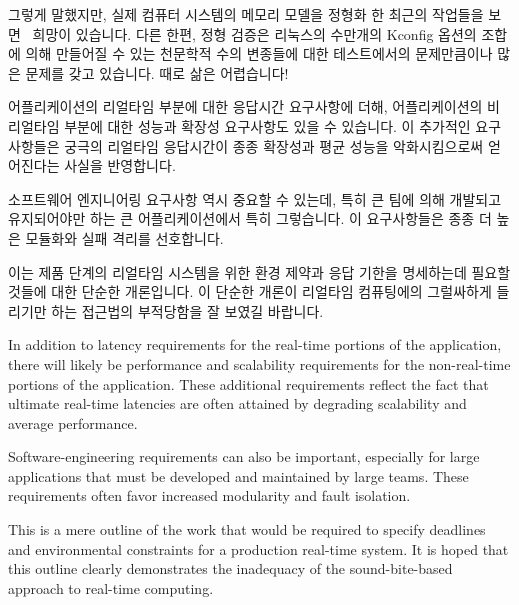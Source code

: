 {	\fi

	그렇게 말했지만, 실제 컴퓨터 시스템의 메모리 모델을 정형화 한 최근의
	작업들을
	보면~\cite{JadeAlglave2011ppcmem,Alglave:2013:SVW:2450268.2450306}
	희망이 있습니다.
	다른 한편, 정형 검증은 리눅스의 수만개의 Kconfig 옵션의 조합에 의해
	만들어질 수 있는 천문학적 수의 변종들에 대한 테스트에서의 문제만큼이나
	많은 문제를 갖고 있습니다.
	때로 삶은 어렵습니다!

}\QuickQuizEnd

어플리케이션의 리얼타임 부분에 대한 응답시간 요구사항에 더해, 어플리케이션의 비
리얼타임 부분에 대한 성능과 확장성 요구사항도 있을 수 있습니다.
이 추가적인 요구사항들은 궁극의 리얼타임 응답시간이 종종 확장성과 평균 성능을
악화시킴으로써 얻어진다는 사실을 반영합니다.

소프트웨어 엔지니어링 요구사항 역시 중요할 수 있는데, 특히 큰 팀에 의해
개발되고 유지되어야만 하는 큰 어플리케이션에서 특히 그렇습니다.
이 요구사항들은 종종 더 높은 모듈화와 실패 격리를 선호합니다.

이는 제품 단계의 리얼타임 시스템을 위한 환경 제약과 응답 기한을 명세하는데
필요할 것들에 대한 단순한 개론입니다.
이 단순한 개론이 리얼타임 컴퓨팅에의 그럴싸하게 들리기만 하는 접근법의
부적당함을 잘 보였길 바랍니다.

\iffalse

In addition to latency requirements for the real-time portions of the
application, there will likely be performance and scalability requirements
for the non-real-time portions of the application.
These additional requirements reflect the fact that ultimate real-time
latencies are often attained by degrading scalability and average performance.

Software-engineering requirements can also be important, especially for
large applications that must be developed and maintained by large teams.
These requirements often favor increased modularity and fault isolation.

This is a mere outline of the work that would be required to specify
deadlines and environmental constraints for a production real-time system.
It is hoped that this outline clearly demonstrates the inadequacy of
the sound-bite-based approach to real-time computing.

